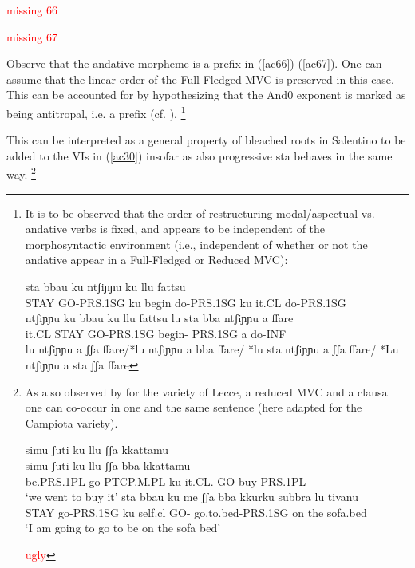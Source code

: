 \documentclass[output=paper]{langscibook}
\begin{document}
\ea \label{ac66}
\textcolor{red}{missing 66}
\ea \label{ac66a}
\ex \label{ac66b}
\z
\z

\ea \label{ac67}
\textcolor{red}{missing 67}
\z

Observe that the andative morpheme is a prefix in (\ref{ac66})-(\ref{ac67}).  One can assume that the linear order of the Full Fledged MVC is preserved in this case.  This can be accounted for by hypothesizing that the And0 exponent is marked as being antitropal, i.e. a prefix (cf. \cite{bye2012a}).
\footnote{It is to be observed that the order of restructuring modal/aspectual vs. andative verbs is fixed, and appears to be independent of the morphosyntactic environment (i.e., independent of whether or not the andative appear in a Full-Fledged or Reduced MVC):

\ea \label{fn32ex}
    \ea \label{fn32exa}\gll sta bbau   ku ntʃiɲɲu   ku llu  fattsu\\
STAY GO-PRS.1SG ku  begin do-PRS.1SG  ku it.CL do-PRS.1SG\\
\glt *ntʃiɲɲu ku bbau ku llu fattsu
    \ex \label{fn32exb}\gll lu  sta  bba   ntʃiɲɲu      a   ffare\\
it.CL  STAY GO-PRS.1SG begin- PRS.1SG  a   do-INF\\
\glt *lu ntʃiɲɲu a ʃʃa ffare/*lu ntʃiɲɲu a bba ffare/ *lu sta ntʃiɲɲu a ʃʃa ffare/ *Lu  ntʃiɲɲu a sta ʃʃa ffare
    \z
\z

}

This can be interpreted as a general property of bleached roots in Salentino to be added to the VIs in (\ref{ac30}) insofar as also progressive sta behaves in the same way. \footnote{As also observed by \cite{ledgeway2016a} for the variety of Lecce, a reduced MVC and a clausal one can co-occur in one and the same sentence (here adapted for the Campiota variety).

\ea \label{fn33ex}
    \ea \label{fn33exa}\gll simu      ʃuti        ku   llu     ʃʃa {} kkattamu\\
  simu      ʃuti       ku   llu    ʃʃa  bba kkattamu\\
be.PRS.1PL go-PTCP.M.PL  ku   it.CL.    GO  buy-PRS.1PL\\
\glt  ‘we went to buy it’
    \ex \label{fn33exb}\gll sta   bbau     ku  me   ʃʃa bba kkurku      subbra lu tivanu\\
    STAY go-PRS.1SG ku  self.cl  GO- go.to.bed-PRS.1SG on  the sofa.bed\\
    \glt ‘I am going to go to be on the sofa bed’
    \z
\z

\textcolor{red}{ugly}

}
\end{document}
